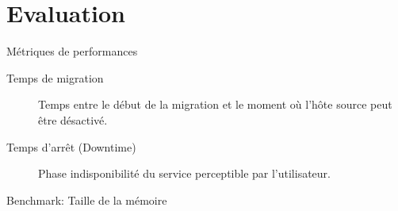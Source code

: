 \documentclass{libs/XJTLU_format}
\begin{document}
\section{Evaluation}
\begin{frame}{Métriques de performances}
    \begin{description}
        \item[Temps de migration] Temps entre le début de la migration et le moment où l'hôte source peut être désactivé.
        \item[Temps d'arrêt (Downtime)] Phase indisponibilité du service perceptible par l'utilisateur.
    \end{description}
\end{frame}

\begin{frame}{Benchmark: Taille de la mémoire}
\end{frame}
\end{document}
